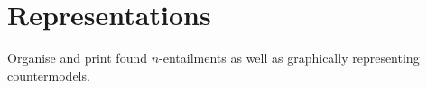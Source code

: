 \documentclass[a4paper, 11pt]{article} %
\newcommand{\tuple}[1]{\langle#1\rangle} %
\newcommand{\set}[1]{\lbrace#1\rbrace} %
\begin{document}







\section{Representations}

Organise and print found $n$-entailments as well as graphically representing countermodels.







%
\end{document}
